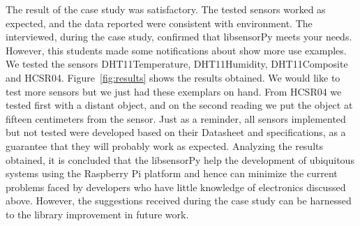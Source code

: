 \documentclass{acm_proc_article-sp}
\begin{document}
The result of the case study was satisfactory. The tested sensors worked as expected, and the data reported were consistent with environment. The interviewed, during the case study, confirmed that libsensorPy meets your needs. However, this students made some notifications about show more use examples.
\newline
\newline
We tested the sensors DHT11Temperature, DHT11Humidity, DHT11Composite and HCSR04. Figure~\ref{fig:results} shows the results obtained. We would like to test more sensors but we just had these exemplars on hand. From HCSR04 we tested first with a distant object, and on the second reading we put the object at fifteen centimeters from the sensor. Just as a reminder, all sensors implemented but not tested were developed based on their Datasheet and specifications, as a guarantee that they will probably work as expected.
\newline
\newline
Analyzing the results obtained, it is concluded that the libsensorPy help the development of ubiquitous systems using the Raspberry Pi platform and hence can minimize the current problems faced by developers who have little knowledge of electronics discussed above. However, the suggestions received during the case study can be harnessed to the library improvement in future work.
\end{document}
